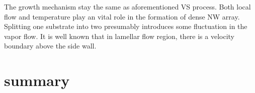 The growth mechanism stay the same as aforementioned VS process. Both local flow and temperature play an vital role in the formation of dense NW array. Splitting one substrate into two presumably introduces some fluctuation in the vapor flow. It is well known that in lamellar flow region, there is a velocity boundary above the side wall.

\section{summary}

